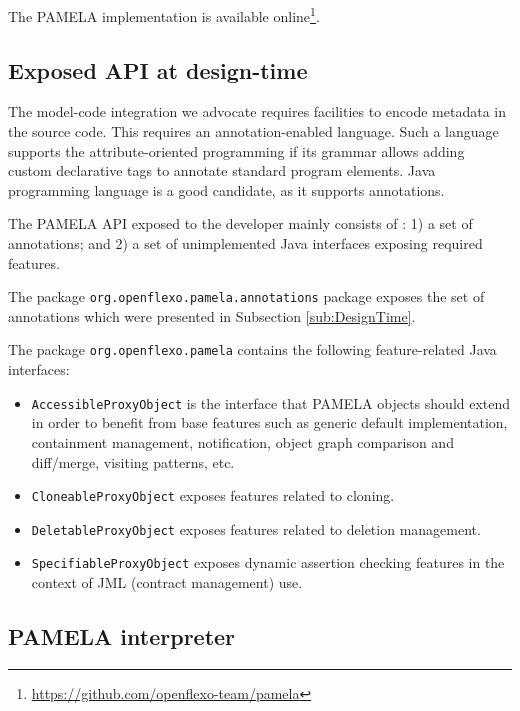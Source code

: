 The PAMELA implementation is available online\footnote {\url{https://github.com/openflexo-team/pamela}}.

\subsection{Exposed API at design-time}

The model-code integration we advocate requires facilities to encode metadata in the source code. This requires an annotation-enabled language. Such a language supports the attribute-oriented programming if its grammar allows adding custom declarative tags to annotate standard program elements. Java programming language is a good candidate, as it supports annotations.

The PAMELA API exposed to the developer mainly consists of : 1) a set of annotations; and 2) a set of unimplemented Java interfaces exposing required features.

The package \texttt{org.openflexo.pamela.annotations} package exposes the set of annotations which were presented in Subsection \ref{sub:DesignTime}.

The package \texttt{org.openflexo.pamela} contains the following feature-related Java interfaces:
\begin{itemize}
    \item \texttt{AccessibleProxyObject} is the interface that PAMELA objects should extend in order to benefit from base features such as generic default implementation, containment management, notification, object graph comparison and diff/merge, visiting patterns, etc.
    \item \texttt{CloneableProxyObject} exposes features related to cloning.
    \item \texttt{DeletableProxyObject} exposes features related to deletion management.
    \item \texttt{SpecifiableProxyObject} exposes dynamic assertion checking features in the context of JML (contract management) use. 
\end{itemize}


\subsection{PAMELA interpreter}

